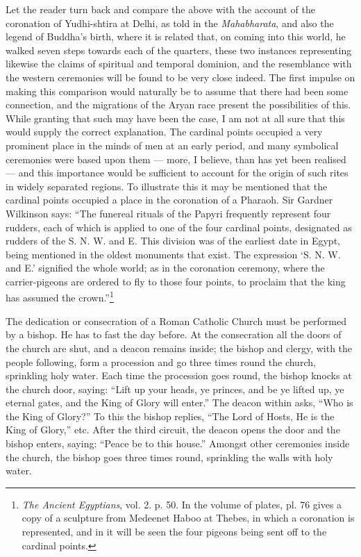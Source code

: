 \documentclass[a4paper, 11pt, oneside, polutonikogreek, english]{article}
\begin{document}
Let the reader turn back and compare the above with the account of the coronation of Yudhi-shtira at Delhi, as told in the \emph{Mahabharata}, and also the legend of Buddha's birth, where it is related that, on coming into this world, he walked seven steps towards each of the quarters, these two instances representing likewise the claims of spiritual and temporal dominion, and the resemblance with the western ceremonies will be found to be very close indeed. The first impulse on making this comparison would naturally be to assume that there had been some connection, and the migrations of the Aryan race present the possibilities of this. While granting that such may have been the case, I am not at all sure that this would supply the correct explanation. The cardinal points occupied a very prominent place in the minds of men at an early period, and many symbolical ceremonies were based upon them --- more, I believe, than has yet been realised --- and this importance would be sufficient to account for the origin of such rites in widely separated regions. To illustrate this it may be mentioned that the cardinal points occupied a place in the coronation of a Pharaoh. Sir Gardner Wilkinson says: ``The funereal rituals of the Papyri frequently represent four rudders, each of which is applied to one of the four cardinal points, designated as rudders of the S. N. W. and E. This division was of the earliest date in Egypt, being mentioned in the oldest monuments that exist. The expression `S. N. W. and E.' signified the whole world; as in the coronation ceremony, where the carrier-pigeons are ordered to fly to those four points, to proclaim that the king has assumed the crown.''\footnote{\emph{The Ancient Egyptians}, vol. 2. p. 50. In the volume of plates, pl. 76 gives a copy of a sculpture from Medeenet Haboo at Thebes, in which a coronation is represented, and in it will be seen the four pigeons being sent off to the cardinal points.}

The dedication or consecration of a Roman Catholic Church must be performed by a bishop. He has to fast the day before. At the consecration all the doors of the church are shut, and a deacon remains inside; the bishop and clergy, with the people following, form a procession and go three times round the church, sprinkling holy water. Each time the procession goes round, the bishop knocks at the church door, saying: ``Lift up your heads, ye princes, and be ye lifted up, ye eternal gates, and the King of Glory will enter.'' The deacon within asks, ``Who is the King of Glory?'' To this the bishop replies, ``The Lord of Hosts, He is the King of Glory,'' etc. After the third circuit, the deacon opens the door and the bishop enters, saying: ``Peace be to this house.'' Amongst other ceremonies inside the church, the bishop goes three times round, sprinkling the walls with holy water.
\end{document}

